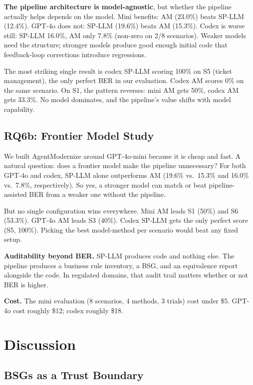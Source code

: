 \documentclass[conference]{IEEEtran}
\begin{document}
\textbf{The pipeline architecture is model-agnostic}, but whether the pipeline actually helps depends on the model. Mini benefits: AM (23.0\%) beats SP-LLM (12.4\%). GPT-4o does not: SP-LLM (19.6\%) beats AM (15.3\%). Codex is worse still: SP-LLM 16.0\%, AM only 7.8\% (non-zero on 2/8 scenarios). Weaker models need the structure; stronger models produce good enough initial code that feedback-loop corrections introduce regressions.

The most striking single result is codex SP-LLM scoring 100\% on S5 (ticket management), the only perfect BER in our evaluation. Codex AM scores 0\% on the same scenario. On S1, the pattern reverses: mini AM gets 50\%, codex AM gets 33.3\%. No model dominates, and the pipeline's value shifts with model capability.

\subsection{RQ6b: Frontier Model Study}
\label{sec:frontier-crossover}

We built AgentModernize around GPT-4o-mini because it is cheap and fast. A natural question: does a frontier model make the pipeline unnecessary? For both GPT-4o and codex, SP-LLM alone outperforms AM (19.6\% vs.\ 15.3\% and 16.0\% vs.\ 7.8\%, respectively). So yes, a stronger model can match or beat pipeline-assisted BER from a weaker one without the pipeline.

But no single configuration wins everywhere. Mini AM leads S1 (50\%) and S6 (53.3\%). GPT-4o AM leads S3 (40\%). Codex SP-LLM gets the only perfect score (S5, 100\%). Picking the best model-method per scenario would beat any fixed setup.

\textbf{Auditability beyond BER.} SP-LLM produces code and nothing else. The pipeline produces a business rule inventory, a BSG, and an equivalence report alongside the code. In regulated domains, that audit trail matters whether or not BER is higher.

\textbf{Cost.} The mini evaluation (8 scenarios, 4 methods, 3 trials) cost under \$5. GPT-4o cost roughly \$12; codex roughly \$18.

\section{Discussion}
\label{sec:discussion}

\subsection{BSGs as a Trust Boundary}
\label{sec:bsg-trust}
\end{document}
